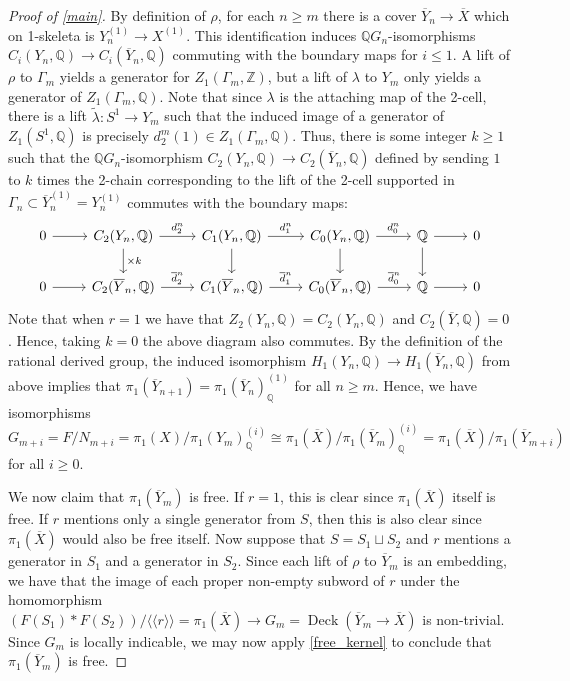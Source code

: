 \documentclass{amsart}
\theoremstyle{definition}
\DeclareMathOperator{\deck}{Deck}
\newcommand{\Z}{\mathbb{Z}}
\newcommand{\Q}{\mathbb{Q}}
\newcommand{\isom}{\cong}
\newcommand{\normal}[1]{\langle\!\langle #1 \rangle\!\rangle}
\begin{document}
\begin{proof}[Proof of \cref{main}]
By definition of $\rho$, for each $n\geqslant m$ there is a cover $\overline{Y}_n\to \overline{X}$ which on 1-skeleta is $Y_n^{(1)}\to X^{(1)}$. This identification induces $\Q G_n$-isomorphisms $C_i(Y_n, \Q)\to C_i(\overline{Y}_n, \Q)$ commuting with the boundary maps for $i\leqslant 1$. A lift of $\rho$ to $\Gamma_m$ yields a generator for $Z_1(\Gamma_m, \Z)$, but a lift of $\lambda$ to $Y_m$ only yields a generator of $Z_1(\Gamma_m, \Q)$. Note that since $\lambda$ is the attaching map of the 2-cell, there is a lift $\tilde{\lambda}\colon S^1\to Y_m$ such that the induced image of a generator of $Z_1(S^1, \Q)$ is precisely $d_2^m(1) \in Z_1(\Gamma_m, \Q)$. Thus, there is some integer $k\geqslant 1$ such that the $\Q G_n$-isomorphism $C_2(Y_n, \Q) \to C_2(\overline{Y}_n, \Q)$ defined by sending $1$ to $k$ times the 2-chain corresponding to the lift of the 2-cell supported in $\Gamma_n\subset \overline{Y}^{(1)}_n = Y_n^{(1)}$ commutes with the boundary maps:
\[
    \begin{tikzcd}
    0 \arrow[r] &C_2(Y_{n}, \Q) \arrow[r, "d_2^{n}"] \arrow[d, "\times k"] & C_1(Y_{n}, \Q) \arrow[r, "d_1^{n}"] \arrow[d] & C_0(Y_{n}, \Q) \arrow[r, "d_0^{n}"] \arrow[d] & \Q \arrow[r] \arrow[d] & 0 \\
    0 \arrow[r] & C_2(\overline{Y}_{n}, \Q) \arrow[r, "\overline{d}_2^{n}"] & C_1(\overline{Y}_{n}, \Q) \arrow[r, "\overline{d}_1^{n}"] & C_0(\overline{Y}_{n}, \Q) \arrow[r, "\overline{d}_0^{n}"] & \Q \arrow[r] & 0
    \end{tikzcd}
    \]
Note that when $r = 1$ we have that $Z_2(Y_n, \Q) = C_2(Y_n, \Q)$ and $C_2(\overline{Y}, \Q) = 0$. Hence, taking $k = 0$ the above diagram also commutes. By the definition of the rational derived group, the induced isomorphism $H_1(Y_n, \Q)\to H_1(\overline{Y}_n, \Q)$ from above implies that $\pi_1\left(\overline{Y}_{n+1}\right) = \pi_1\left(\overline{Y}_n\right)^{(1)}_{\Q}$ for all $n\geqslant m$. Hence, we have isomorphisms
\[
G_{m+i} = F/N_{m+i} = \pi_1(X)/\pi_1(Y_m)^{(i)}_{\Q} \isom \pi_1\left(\overline{X}\right)/\pi_1\left(\overline{Y}_{m}\right)_{\Q}^{(i)} = \pi_1\left(\overline{X}\right)/\pi_1\left(\overline{Y}_{m+i}\right)
\]
for all $i\geqslant 0$.

We now claim that $\pi_1\left(\overline{Y}_m\right)$ is free. If $r = 1$, this is clear since $\pi_1\left(\overline{X}\right)$ itself is free. If $r$ mentions only a single generator from $S$, then this is also clear since $\pi_1\left(\overline{X}\right)$ would also be free itself. Now suppose that $S = S_1\sqcup S_2$ and $r$ mentions a generator in $S_1$ and a generator in $S_2$. Since each lift of $\rho$ to $\overline{Y}_m$ is an embedding, we have that the image of each proper non-empty subword of $r$ under the homomorphism $(F(S_1)*F(S_2))/\normal{r} = \pi_1\left(\overline{X}\right)\to G_m = \deck\left(\overline{Y}_m\to\overline{X}\right)$ is non-trivial. Since $G_m$ is locally indicable, we may now apply \cref{free_kernel} to conclude that $\pi_1\left(\overline{Y}_m\right)$ is free. 


\end{proof}
\end{document}
